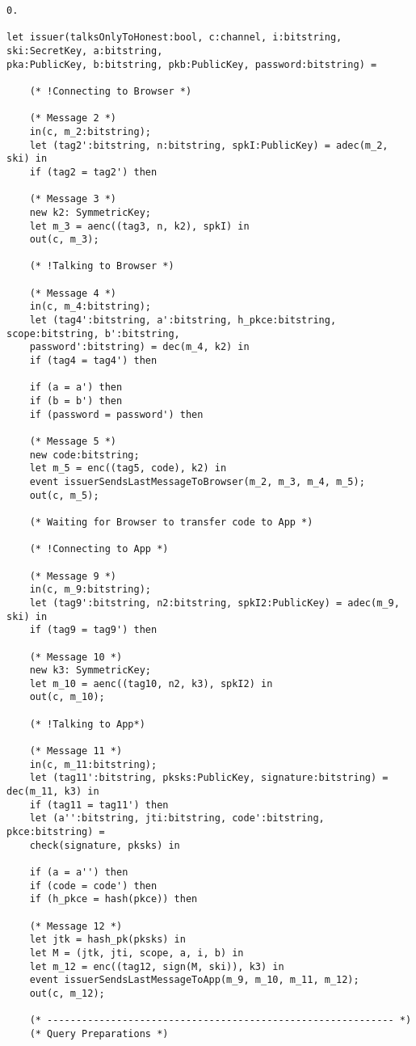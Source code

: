 \begin{Verbatim}[fontsize=\small]
    0.

let issuer(talksOnlyToHonest:bool, c:channel, i:bitstring, ski:SecretKey, a:bitstring,
pka:PublicKey, b:bitstring, pkb:PublicKey, password:bitstring) =

    (* !Connecting to Browser *)

    (* Message 2 *)
    in(c, m_2:bitstring);
    let (tag2':bitstring, n:bitstring, spkI:PublicKey) = adec(m_2, ski) in
    if (tag2 = tag2') then

    (* Message 3 *)
    new k2: SymmetricKey;
    let m_3 = aenc((tag3, n, k2), spkI) in
    out(c, m_3);

    (* !Talking to Browser *)

    (* Message 4 *)
    in(c, m_4:bitstring);
    let (tag4':bitstring, a':bitstring, h_pkce:bitstring, scope:bitstring, b':bitstring,
    password':bitstring) = dec(m_4, k2) in
    if (tag4 = tag4') then

    if (a = a') then
    if (b = b') then
    if (password = password') then

    (* Message 5 *)
    new code:bitstring;
    let m_5 = enc((tag5, code), k2) in
    event issuerSendsLastMessageToBrowser(m_2, m_3, m_4, m_5);
    out(c, m_5);

    (* Waiting for Browser to transfer code to App *)

    (* !Connecting to App *)
     
    (* Message 9 *)
    in(c, m_9:bitstring);
    let (tag9':bitstring, n2:bitstring, spkI2:PublicKey) = adec(m_9, ski) in
    if (tag9 = tag9') then

    (* Message 10 *)
    new k3: SymmetricKey;
    let m_10 = aenc((tag10, n2, k3), spkI2) in
    out(c, m_10);

    (* !Talking to App*)

    (* Message 11 *)
    in(c, m_11:bitstring);
    let (tag11':bitstring, pksks:PublicKey, signature:bitstring) = dec(m_11, k3) in
    if (tag11 = tag11') then
    let (a'':bitstring, jti:bitstring, code':bitstring, pkce:bitstring) = 
    check(signature, pksks) in

    if (a = a'') then
    if (code = code') then
    if (h_pkce = hash(pkce)) then

    (* Message 12 *)
    let jtk = hash_pk(pksks) in
    let M = (jtk, jti, scope, a, i, b) in
    let m_12 = enc((tag12, sign(M, ski)), k3) in
    event issuerSendsLastMessageToApp(m_9, m_10, m_11, m_12);
    out(c, m_12);

    (* ------------------------------------------------------------ *)
    (* Query Preparations *)


\end{Verbatim}
